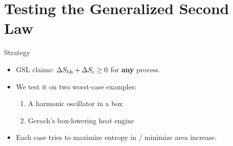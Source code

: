 \documentclass[aspectratio=169]{beamer}
\begin{document}




\section{Testing the Generalized Second Law}

\begin{frame}{Strategy}
\begin{itemize}
    \item GSL claims: $\Delta S_{\rm bh}+\Delta S_c \ge 0$ for \textbf{any} process.
    \item We test it on two worst-case examples:
    \begin{enumerate}
        \item A harmonic oscillator in a box
        \item Geroch's box-lowering heat engine
    \end{enumerate}
    \item Each case tries to maximize entropy in / minimize area increase.
\end{itemize}
\end{frame}
\end{document}
